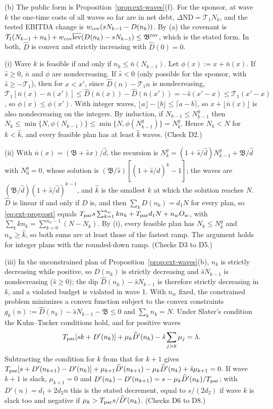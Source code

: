 (b) The public form is Proposition~\ref{prop:ext-waves}(f). For the sponsor, at wave $k$ the one-time costs of all waves so far are in net debt, $\Delta\mathrm{ND}=\mathcal T_1N_k$, and the tested EBITDA change is $w_{\rm cov}(sN_{k-1}-D(n_k))$. By (a) the covenant is $\mathcal T_1(N_{k-1}+n_k)+w_{\rm cov}\overline{\rm lev}(D(n_k)-sN_{k-1})\le\mathfrak B^{\rm cov}$, which is the stated form. In both, $\widehat D$ is convex and strictly increasing with $\widehat D(0)=0$.

(i) Wave $k$ is feasible if and only if $n_k\le\bar n(N_{k-1})$. Let $\phi(x):=x+\bar n(x)$. If $\hat s\ge0$, $\bar n$ and $\phi$ are nondecreasing. If $\hat s<0$ (only possible for the sponsor, with $\hat s\ge-\mathcal T_1$), then for $x<x'$, since $\widehat D(n)-\mathcal T_1n$ is nondecreasing, $\mathcal T_1[\bar n(x)-\bar n(x')]\le\widehat D(\bar n(x))-\widehat D(\bar n(x'))=-\hat s(x'-x)\le\mathcal T_1(x'-x)$, so $\phi(x)\le\phi(x')$. With integer waves, $\lfloor a\rfloor-\lfloor b\rfloor\le\lceil a-b\rceil$, so $x+\lfloor\bar n(x)\rfloor$ is also nondecreasing on the integers. By induction, if $N_{k-1}\le N^g_{k-1}$ then $N_k\le\min\{N,\phi(N_{k-1})\}\le\min\{N,\phi(N^g_{k-1})\}=N^g_k$. Hence $N_k<N$ for $k<\hat k$, and every feasible plan has at least $\hat k$ waves. (Check D2.)

(ii) With $\bar n(x)=(\mathfrak B+\hat sx)/\hat d$, the recursion is $N^g_k=(1+\hat s/\hat d)N^g_{k-1}+\mathfrak B/\hat d$ with $N^g_0=0$, whose solution is $(\mathfrak B/\hat s)[(1+\hat s/\hat d)^k-1]$; the waves are $(\mathfrak B/\hat d)(1+\hat s/\hat d)^{k-1}$, and $\hat k$ is the smallest $k$ at which the solution reaches $N$. $\widehat D$ is linear if and only if $D$ is, and then $\sum_kD(n_k)=d_1N$ for every plan, so \eqref{eq:ext-progcost} equals $T_{\rm par}s\sum_{k=1}^{n_w}kn_k+T_{\rm par}d_1N+n_wO_w$, with $\sum_kkn_k=\sum_{k=0}^{n_w-1}(N-N_k)$. By (i), every feasible plan has $N_k\le N^g_k$ and $n_w\ge\hat k$, so both sums are at least those of the fastest ramp. The argument holds for integer plans with the rounded-down ramp. (Checks D3 to D5.)

(iii) In the unconstrained plan of Proposition~\ref{prop:ext-waves}(b), $n_k$ is strictly decreasing while positive, so $\widehat D(n_k)$ is strictly decreasing and $\hat sN_{k-1}$ is nondecreasing ($\hat s\ge0$); the dip $\widehat D(n_k)-\hat sN_{k-1}$ is therefore strictly decreasing in $k$, and a violated budget is violated in wave 1. With $n_w$ fixed, the constrained problem minimizes a convex function subject to the convex constraints $g_k(n):=\widehat D(n_k)-\hat sN_{k-1}-\mathfrak B\le0$ and $\sum_kn_k=N$. Under Slater's condition the Kuhn--Tucker conditions hold, and for positive waves
\[
T_{\rm par}[sk+D'(n_k)]+\mu_k\widehat D'(n_k)-\hat s\sum_{j>k}\mu_j=\lambda .
\]
Subtracting the condition for $k$ from that for $k+1$ gives $T_{\rm par}[s+D'(n_{k+1})-D'(n_k)]+\mu_{k+1}\widehat D'(n_{k+1})-\mu_k\widehat D'(n_k)+\hat s\mu_{k+1}=0$. If wave $k+1$ is slack, $\mu_{k+1}=0$ and $D'(n_k)-D'(n_{k+1})=s-\mu_k\widehat D'(n_k)/T_{\rm par}$; with $D'(n)=d_1+2d_2n$ this is the stated decrement, equal to $s/(2d_2)$ if wave $k$ is slack too and negative if $\mu_k>T_{\rm par}s/\widehat D'(n_k)$. (Checks D6 to D8.)

